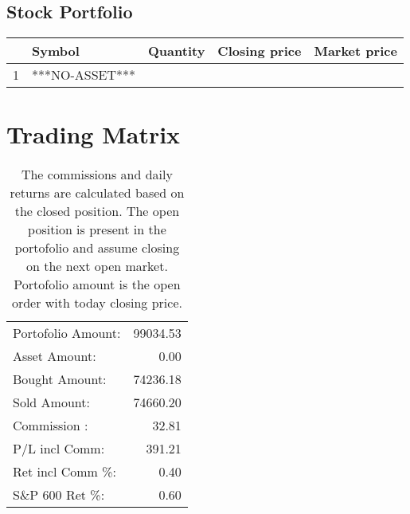 \documentclass{tufte-handout}\usepackage[]{graphicx}\usepackage[]{color}
\begin{document}
\subsection{Stock Portfolio}
\begin{table}[ht]
\centering
\begin{tabular}{llrrr}
  \hline
 & Symbol & Quantity & Closing price & Market price \\ 
  \hline
1 & ***NO-ASSET*** &  &  &  \\ 
   \hline
\end{tabular}
\end{table}



\section{Trading Matrix}

\begin{table}[ht]
\begin{tabular}{lr}
   \hline
Portofolio Amount: & 99034.53 \\ 
  Asset Amount: & 0.00 \\ 
  Bought Amount: & 74236.18 \\ 
  Sold   Amount: & 74660.20 \\ 
  Commission   : & 32.81 \\ 
  P/L incl Comm: & 391.21 \\ 
  Ret incl Comm \%: & 0.40 \\ 
  S\&P 600 Ret \%: & 0.60 \\ 
   \hline
\end{tabular}
\caption{The commissions and daily returns are calculated based on the closed position.
The open position is present in the portofolio and assume closing on the next open market.
Portofolio amount is the open order with today closing price.} 
\end{table}



% 
% 
\end{document}
